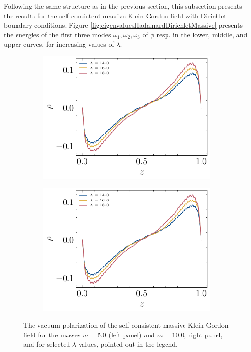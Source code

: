 Following the same structure as in the previous section, this subsection presents the results for the self-consistent massive Klein-Gordon field with Dirichlet boundary conditions.  Figure \ref{fig:eigenvaluesHadamardDirichletMassive} presents the energies of the first three modes $\omega_1, \omega_2, \omega_3$ of $\phi$ resp. in the lower, middle, and upper curves, for increasing values of $\lambda$.

 \begin{figure}
\begin{subfigure}{0.5\textwidth}
     \centering
     \includegraphics[width=\linewidth]{figures/dirichlet/vacuumPolarizationEvolution_M_5.pdf}
\end{subfigure}     
\begin{subfigure}{0.5\textwidth}
     \centering
     \includegraphics[width=\linewidth]{figures/dirichlet/vacuumPolarizationEvolution_M_5.pdf}
\end{subfigure}     
\caption{The vacuum polarization of the self-consistent massive Klein-Gordon field for the masses $m=5.0$ (left panel) and $m=10.0$, right panel, and for selected $\lambda$ values, pointed out in the legend.}
     \label{fig:vacuum-polarization-massive-dirichlet}
 \end{figure}

